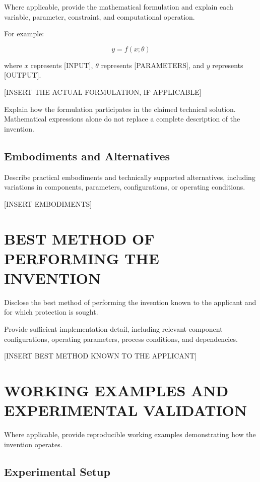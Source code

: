 \documentclass[12pt,a4paper]{article}
\begin{document}
Where applicable, provide the mathematical formulation
and explain each variable, parameter, constraint, and
computational operation.

For example:

\begin{equation}
    y = f(x;\theta)
\end{equation}

where $x$ represents [INPUT], $\theta$ represents
[PARAMETERS], and $y$ represents [OUTPUT].

[INSERT THE ACTUAL FORMULATION, IF APPLICABLE]

Explain how the formulation participates in the claimed
technical solution. Mathematical expressions alone do
not replace a complete description of the invention.

\subsection{Embodiments and Alternatives}

Describe practical embodiments and technically
supported alternatives, including variations in
components, parameters, configurations, or operating
conditions.

[INSERT EMBODIMENTS]

\section{BEST METHOD OF PERFORMING THE INVENTION}

Disclose the best method of performing the invention
known to the applicant and for which protection is sought.

Provide sufficient implementation detail, including
relevant component configurations, operating parameters,
process conditions, and dependencies.

[INSERT BEST METHOD KNOWN TO THE APPLICANT]

\section{WORKING EXAMPLES AND EXPERIMENTAL VALIDATION}

Where applicable, provide reproducible working examples
demonstrating how the invention operates.

\subsection{Experimental Setup}
\end{document}
